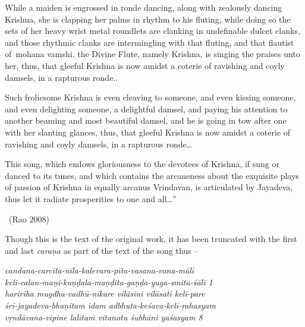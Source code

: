 \begin{myquote}
While a maiden is engrossed in ronde dancing, along with zealously dancing Krishna, she is clapping her palms in rhythm to his fluting, while doing so the sets of her heavy wrist metal roundlets are clanking in undefinable dulcet clanks, and those rhythmic clanks are intermingling with that fluting, and that flautist of mohana vamshi, the Divine Flute, namely Krishna, is singing the praises unto her, thus, that gleeful Krishna is now amidst a coterie of ravishing and coyly damsels, in a rapturous ronde..
\end{myquote}

\begin{myquote}
Such frolicsome Krishna is even cleaving to someone, and even kissing someone, and even delighting someone, a delightful damsel, and paying his attention to another beaming and most beautiful damsel, and he is going in tow after one with her slanting glances, thus, that gleeful Krishna is now amidst a coterie of ravishing and coyly damsels, in a rapturous ronde…
\end{myquote}

\newpage

\begin{myquote}
This song, which endows gloriousness to the devotees of Krishna, if sung or danced to its tunes, and which contains the arcaneness about the exquisite plays of passion of Krishna in equally arcanus Vrindavan, is articulated by Jayadeva, thus let it radiate prosperities to one and all…” 

~\hfill (Rao 2008)
\end{myquote}

Though this is the text of the original work, it has been truncated with the first and last \textit{caraṇa} as part of the text of the song thus –

\begin{myquote}
\textit{candana-carcita-nīla-kalevara-pīta-vasana-vana-mālī }\\\textit{keli-calan-maṇi-kuṇḍala-maṇḍita-gaṇḍa-yuga-smita-śālī  1 }\\\textit{haririha mugdha-vadhū-nikare vilāsini vilāsati kelī-pare}\\\textit{śrī-jayadeva-bhaṇitam idam adbhuta-keśava-keli-rahasyam } \\\textit{vṛndāvana-vipine lalitaṁ vitanotu śubhāni yaśasyam  8 }
\end{myquote}


